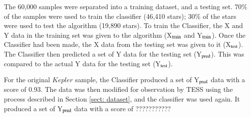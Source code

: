 \documentclass[a4paper,fleqn,usenatbib,useAMS]{mnras}
\begin{document}
The 60,000 samples were separated into a training dataset, and a testing set. 70\% of the samples were used to train the classifier (46,410 stars); 30\% of the stars were used to test the algorithm (19,890 stars). To train the Classifier, the X and Y data in the training set was given to the algorithm (X$_{\rm train}$ and Y$_{\rm train}$). Once the Classifier had been made, the X data from the testing set was given to it (X$_{\rm test}$). The Classifier then predicted a set of Y data for the testing set (Y$_{\rm pred}$). This was compared to the actual Y data for the testing set (Y$_{\rm test}$).

For the original $Kepler$ sample, the Classifier produced a set of Y$_{\rm pred}$ data with a score of 0.93. The data was then modified for observation by TESS using the process described in Section \ref{sect: dataset}, and the classifier was used again. It produced a set of Y$_{\rm pred}$ data with a score of ???????????















\bsp
\label{lastpage}
\end{document}

